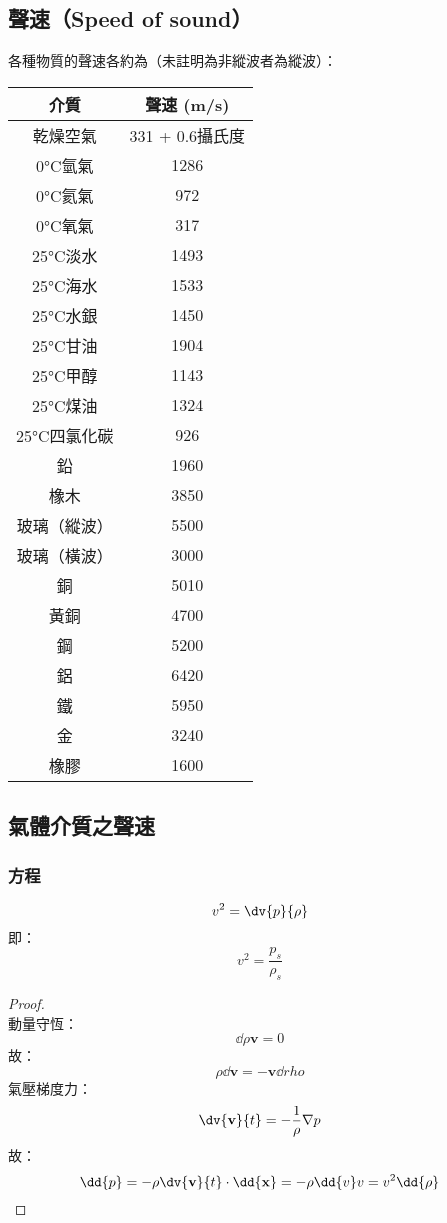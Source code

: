 \documentclass[a4paper,12pt]{report}
\begin{document}
\subsection{聲速（Speed of sound）}
各種物質的聲速各約為（未註明為非縱波者為縱波）：
\begin{longtable}[c]{|c|c|}
\hline
介質 & 聲速 (m/s)\\\hline\endhead
乾燥空氣 & 331 + 0.6攝氏度\\\hline
0°C氫氣 & 1286\\\hline
0°C氦氣 & 972\\\hline
0°C氧氣 & 317\\\hline
25°C淡水 & 1493\\\hline
25°C海水 & 1533\\\hline
25°C水銀 & 1450\\\hline
25°C甘油 & 1904\\\hline
25°C甲醇 & 1143\\\hline
25°C煤油 & 1324\\\hline
25°C四氯化碳 & 926\\\hline
鉛 & 1960\\\hline
橡木 & 3850\\\hline
玻璃（縱波） & 5500\\\hline
玻璃（橫波） & 3000\\\hline
銅 & 5010\\\hline
黃銅 & 4700\\\hline
鋼 & 5200\\\hline
鋁 & 6420\\\hline
鐵 & 5950\\\hline
金 & 3240\\\hline
橡膠 & 1600\\\hline
\end{longtable}\FB
\subsection {氣體介質之聲速}
\subsubsection {方程}
\[v^2 = \dv{p}{\rho}\]
即：
\[v^2=\frac{p_s}{\rho_s}\]
\begin{proof}\mbox{}\\
動量守恆：
\[\dd{\rho \mathbf{v}} = 0\]
故：
\[\rho\dd{\mathbf{v}}=-\mathbf{v}\dd{rho}\]
氣壓梯度力：
\[\dv{\mathbf{v}}{t} = -\frac{1}{\rho}\nabla p\]
故：
\[\dd{p}=-\rho\dv{\mathbf{v}}{t}\cdot\dd{\mathbf{x}}=-\rho\dd{v}v=v^2\dd{\rho}\]
\end{proof}
\end{document}
